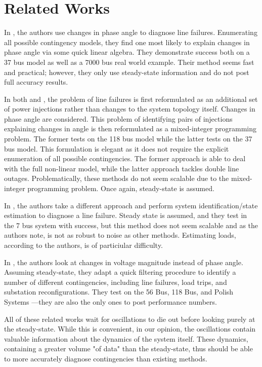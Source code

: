 \section{Related Works}

In \cite{tate2008line}, the authors use changes in phase angle to diagnose line failures. Enumerating all possible contingency models, they find one most likely to explain changes in phase angle via some quick linear algebra. They demonstrate success both on a 37 bus model as well as a 7000 bus real world example. Their method seems fast and practical; however, they only use steady-state information and do not post full accuracy results. 

In both \cite{emami2013external} and \cite{tate2009double}, the problem of line failures is first reformulated as an additional set of power injections rather than changes to the system topology itself. Changes in phase angle are considered. This problem of identifying pairs of injections explaining changes in angle is then reformulated as a mixed-integer programming problem. The former tests on the 118 bus model while the latter tests on the 37 bus model. This formulation is elegant as it does not require the explicit enumeration of all possible contingencies. The former approach is able to deal with the full non-linear model, while the latter approach tackles double line outages. Problematically, these methods do not seem scalable due to the mixed-integer programming problem. Once again, steady-state is assumed. 

In \cite{rogers2011identification}, the authors take a different approach and perform system identification/state estimation to diagnose a line failure. Steady state is assumed, and they test in the 7 bus system with success, but this method does not seem scalable and as the authors note, is not as robust to noise as other methods. Estimating loads, according to the authors, is of particiular difficulty.  

In \cite{ponce2016flier}, the authors look at changes in voltage magnitude instead of phase angle. Assuming steady-state, they adapt a quick filtering procedure to identify a number of different contingencies, including line failures, load trips, and substation reconfigurations. They test on the 56 Bus, 118 Bus, and Polish Systems ---they are also the only ones to post performance numbers. 

All of these related works wait for oscillations to die out before looking purely at the steady-state. While this is convenient, in our opinion, the oscillations contain valuable information about the dynamics of the system itself. These dynamics, containing a greater volume "of data" than the steady-state, thus should be able to more accurately diagnose contingencies than existing methods. 

